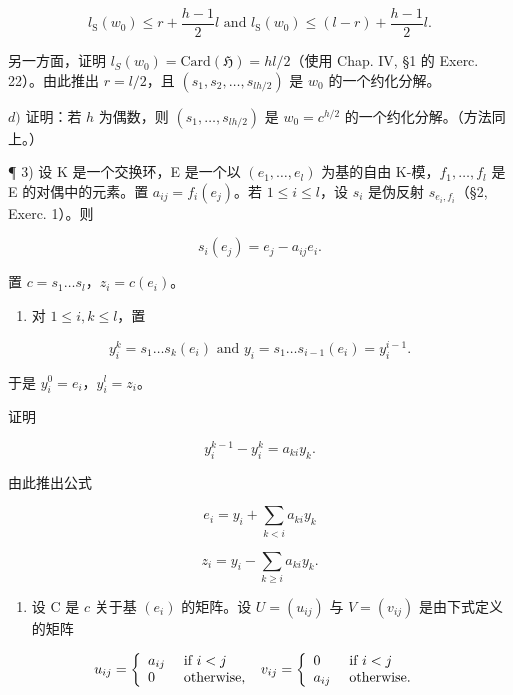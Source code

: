 \[
l _ {\mathrm{S}} (w _ {0}) \leqslant r + \frac {h - 1}{2} l \text { and } l _ {\mathrm{S}} (w _ {0}) \leqslant (l - r) + \frac {h - 1}{2} l.
\]

另一方面，证明 \(l_{S}(w_0) = \mathrm{Card}(\mathfrak{H}) = hl / 2\)（使用 Chap. IV, §1 的 Exerc. 22）。由此推出 \(r = l / 2\)，且 \((s_1, s_2, \ldots, s_{lh / 2})\) 是 \(w_0\) 的一个约化分解。

\(d)\) 证明：若 \(h\) 为偶数，则 \((s_1,\ldots ,s_{lh / 2})\) 是 \(w_{0} = c^{h / 2}\) 的一个约化分解。（方法同上。）

¶ 3) 设 K 是一个交换环，E 是一个以 \((e_1, \ldots, e_l)\) 为基的自由 K-模，\(f_1, \ldots, f_l\) 是 E 的对偶中的元素。置 \(a_{ij} = f_i(e_j)\)。若 \(1 \leqslant i \leqslant l\)，设 \(s_i\) 是伪反射 \(s_{e_i, f_i}\)（\S 2, Exerc. 1）。则

\[
s _ {i} (e _ {j}) = e _ {j} - a _ {i j} e _ {i}.
\]

置 \(c = s_1 \ldots s_l\)，\(z_i = c(e_i)\)。

\begin{enumerate}
\def\labelenumi{\alph{enumi})}
\tightlist
\item
  对 \(1 \leqslant i, k \leqslant l\)，置
\end{enumerate}

\[
y _ {i} ^ {k} = s _ {1} \dots s _ {k} (e _ {i}) \text { and } y _ {i} = s _ {1} \dots s _ {i - 1} (e _ {i}) = y _ {i} ^ {i - 1}.
\]

于是 \(y_{i}^{0} = e_{i}\)，\(y_{i}^{l} = z_{i}\)。

证明

\[
y _ {i} ^ {k - 1} - y _ {i} ^ {k} = a _ {k i} y _ {k}.
\]

由此推出公式

\[
e _ {i} = y _ {i} + \sum_ {k <   i} a _ {k i} y _ {k}
\]

\[
z _ {i} = y _ {i} - \sum_ {k \geqslant i} a _ {k i} y _ {k}.
\]

\begin{enumerate}
\def\labelenumi{\alph{enumi})}
\setcounter{enumi}{1}
\tightlist
\item
  设 C 是 \(c\) 关于基 \((e_i)\) 的矩阵。设 \(U = (u_{ij})\) 与 \(V = (v_{ij})\) 是由下式定义的矩阵
\end{enumerate}

\[
u _ {i j} = \left\{ \begin{array}{l l} a _ {i j} & \text { if } i <   j \\ 0 & \text { otherwise, } \end{array} \right. v _ {i j} = \left\{ \begin{array}{l l} 0 & \text { if } i <   j \\ a _ {i j} & \text { otherwise. } \end{array} \right.
\]

